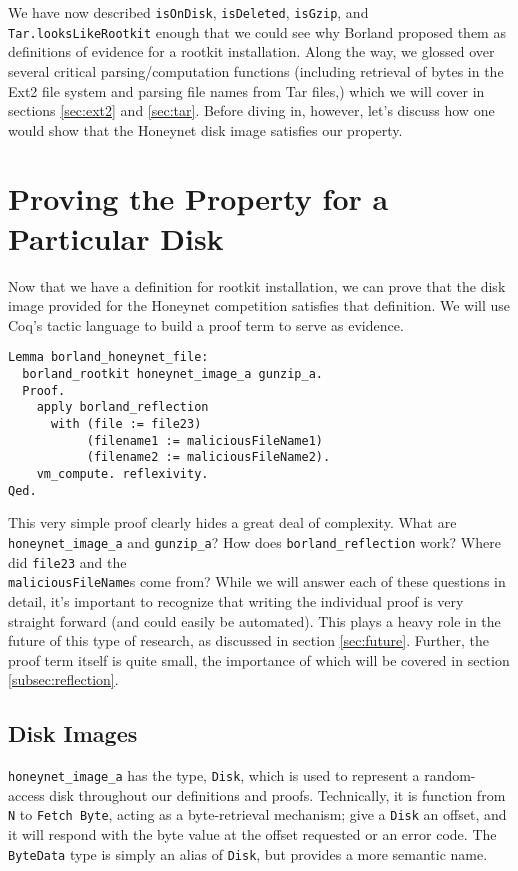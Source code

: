 \documentclass[nocopyrightspace]{sigplanconf}
\begin{document}
We have now described {\tt isOnDisk}, {\tt isDeleted}, {\tt isGzip}, and {\tt
Tar.looksLikeRootkit} enough that we could see why Borland proposed them as
definitions of evidence for a rootkit installation. Along the way, we glossed
over several critical parsing/computation functions (including retrieval of
bytes in the Ext2 file system and parsing file names from Tar files,) which we
will cover in sections \ref{sec:ext2} and \ref{sec:tar}. Before diving in,
however, let's discuss how one would show that the Honeynet disk image
satisfies our property.

\section{Proving the Property for a Particular Disk}
\label{sec:proving}

Now that we have a definition for rootkit installation, we can prove that the
disk image provided for the Honeynet competition satisfies that definition. We
will use Coq's tactic language to build a proof term to serve as evidence.

\begin{lstlisting}
Lemma borland_honeynet_file:
  borland_rootkit honeynet_image_a gunzip_a.
  Proof.
    apply borland_reflection 
      with (file := file23) 
           (filename1 := maliciousFileName1) 
           (filename2 := maliciousFileName2).
    vm_compute. reflexivity.
Qed.
\end{lstlisting}

This very simple proof clearly hides a great deal of complexity. What are {\tt
honeynet\_image\_a} and {\tt gunzip\_a}? How does {\tt borland\_reflection}
work? Where did {\tt file23} and the \\{\tt maliciousFileName}s come from?
While we will answer each of these questions in detail, it's important to
recognize that writing the individual proof is very straight forward (and
could easily be automated). This plays a heavy role in the future of this type
of research, as discussed in section \ref{sec:future}. Further, the proof term
itself is quite small, the importance of which will be covered in section
\ref{subsec:reflection}.

\subsection{Disk Images}

{\tt honeynet\_image\_a} has the type, {\tt Disk}, which is used to represent
a random-access disk throughout our definitions and proofs.  Technically, it
is function from {\tt N} to {\tt Fetch Byte}, acting as a byte-retrieval
mechanism; give a {\tt Disk} an offset, and it will respond with the byte
value at the offset requested or an error code. The {\tt ByteData} type is
simply an alias of {\tt Disk}, but provides a more semantic name.
\end{document}
